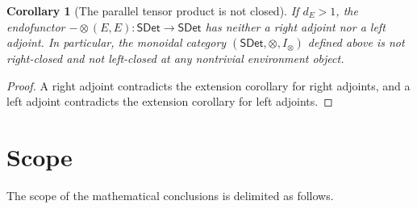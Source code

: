 \documentclass[11pt,a4paper]{article}
\theoremstyle{definition}
\theoremstyle{plain}
\newtheorem{corollary}[theorem]{Corollary}
\theoremstyle{remark}
\newcommand{\SDet}{\mathsf{SDet}}
\begin{document}
\begin{corollary}[The parallel tensor product is not closed]
\label{cor:not-closed}
If $d_E>1$, the endofunctor $-\otimes(E,E):\SDet\to\SDet$ has neither a
right adjoint nor a left adjoint. In particular, the monoidal category
$(\SDet,\otimes,I_\otimes)$ defined above is not right-closed and not
left-closed at any nontrivial environment object.
\end{corollary}
\begin{proof}
A right adjoint contradicts the extension corollary for right adjoints,
and a left adjoint contradicts the extension corollary for left
adjoints.
\end{proof}

\section{Scope}

The scope of the mathematical conclusions is delimited as follows.
\end{document}
